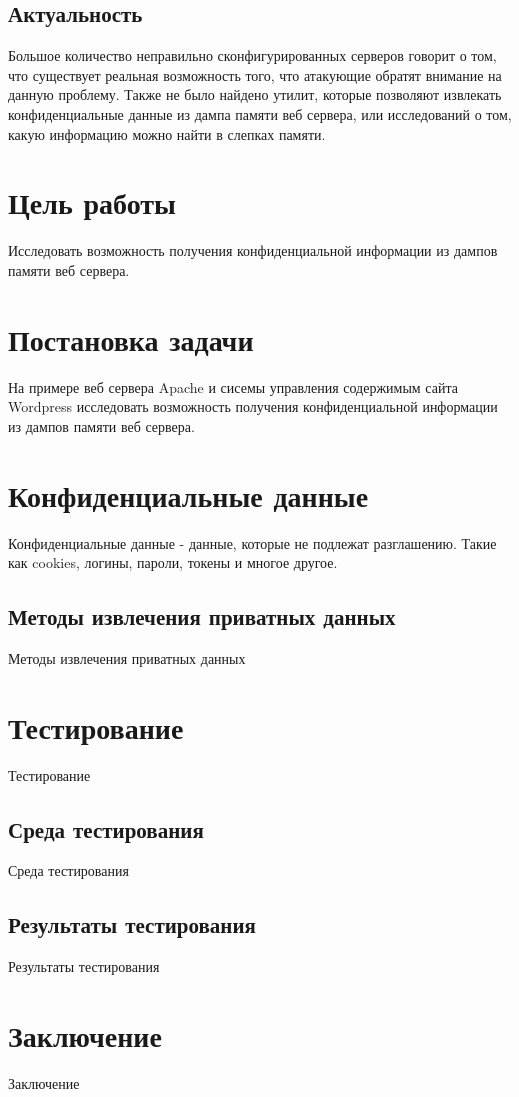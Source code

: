 \documentclass[20pt]{article}
\begin{document}
\subsection{Актуальность}
Большое количество неправильно сконфигурированных серверов говорит о том, что существует реальная возможность того, что атакующие
обратят внимание на данную проблему. Также не было найдено утилит, которые позволяют извлекать конфиденциальные данные из дампа памяти веб сервера,
или исследований о том, какую информацию можно найти в слепках памяти.

\section{Цель работы}
Исследовать возможность получения конфиденциальной информации из дампов памяти веб сервера.

\section{Постановка задачи}
На примере веб сервера Apache и сисемы управления содержимым сайта Wordpress исследовать возможность получения конфиденциальной информации
из дампов памяти веб сервера.

\section{Конфиденциальные данные}
Конфиденциальные данные - данные, которые не подлежат разглашению. Такие как cookies, логины, пароли, токены и многое другое.

\subsection{Методы извлечения приватных данных}
Методы извлечения приватных данных

\section{Тестирование}
Тестирование

\subsection{Среда тестирования}
Среда тестирования

\subsection{Результаты тестирования}
Результаты тестирования

\section{Заключение}
Заключение



\end{document}
